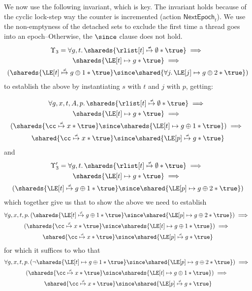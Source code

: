 We now use the following invariant, which is key. 
The invariant holds because of the cyclic lock-step 
way the counter is incremented
(action $\textsf{NextEpoch}_t$).  We use the non-emptyness of the 
detached sets to exclude the first time a thread goes into an epoch--Otherwise, the $\since$ clause 
does not hold.
\begin{multline}
\Upsilon_3 = \forall g,t.\, 
\shareds{\rlist[t] \nmapsto \emptyset * \true} 
\implies \mbox{}\\
\shareds{\LE[t] \mapsto g * \true} \implies 
\mbox{}\\
(\shareds{\LE[t] \nmapsto g \oplus 1 * \true} 
\mbox{} 
\since \shared{ \forall j.\, \LE[j] \mapsto g \oplus 2 * \true}) 
\end{multline}
to establish the above by instantiating $s$ with $t$ and $j$ with $p$, getting:

\begin{multline}
\forall g,x,t,A,p.\, 
\shareds{\rlist[t] \nmapsto \emptyset * \true} \implies \mbox{}
\\
\shareds{\LE[t] \mapsto g * \true} \implies \mbox{} \\
(\shareds{\cc\nmapsto x * \true}  
\since
\shareds{\LE[t] \mapsto  g \oplus 1 * \true}) \implies \mbox{}\\
\shared{\cc \nmapsto x * \true} \since \shared{\LE[p] \nmapsto g * \true}
\end{multline}
and
\begin{multline}
\Upsilon'_3 = \forall g,t.\, 
\shareds{\rlist[t] \nmapsto \emptyset * \true} 
\implies \mbox{}\\
\shareds{\LE[t] \mapsto g * \true} \implies 
\mbox{}\\
(\shareds{\LE[t] \nmapsto g \oplus 1 * \true} 
\mbox{} 
\since \shared{\LE[p] \mapsto g \oplus 2 * \true}) 
\end{multline}
which together give us that to show the above we need to establish
\begin{multline}
\forall g,x,t,p.\, 
(\shareds{\LE[t] \nmapsto g \oplus 1 * \true} 
\mbox{} 
\since \shared{\LE[p] \mapsto g \oplus 2 * \true}) 
\implies \mbox{} \\
(\shareds{\cc\nmapsto x * \true}  
\since
\shareds{\LE[t] \mapsto  g \oplus 1 * \true}) \implies \mbox{}\\
\shared{\cc \nmapsto x * \true} \since \shared{\LE[p] \nmapsto g * \true}
\end{multline}
for which it suffices to who that
\begin{multline}
\forall g,x,t,p.\, 
(\neg{\shareds{\LE[t] \mapsto g \oplus 1 * \true}} 
\since \shared{\LE[p] \mapsto g \oplus 2 * \true}) 
\implies \mbox{} \\
(\shareds{\cc\nmapsto x * \true}  
\since
\shareds{\LE[t] \mapsto  g \oplus 1 * \true}) \implies \mbox{}\\
\shared{\cc \nmapsto x * \true} \since \shared{\LE[p] \nmapsto g * \true}
\end{multline}


